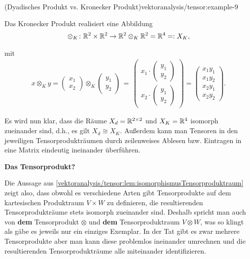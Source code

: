 \begin{example}{(Dyadisches Produkt vs. Kronecker Produkt)}{vektoranalysis/tensor:example-9}
\par
Das Kronecker Produkt realisiert eine Abbildung
\begin{align*}
\otimes_K \colon \mathbb{R}^2 \times \mathbb{R}^2 \rightarrow \mathbb{R}^2 \otimes_K \mathbb{R}^2 = \mathbb{R}^{4} =: X_K,
\end{align*}
\par
mit
\begin{align*}
x \otimes_K y =
\begin{pmatrix}
x_1 \\ x_2
\end{pmatrix} \otimes_K 
\begin{pmatrix}
y_1 \\ y_2
\end{pmatrix}
\, = \, 
\begin{pmatrix}
x_1 \cdot \begin{pmatrix} y_1 \\ y_2 \end{pmatrix} \\ 
x_2 \cdot \begin{pmatrix} y_1 \\ y_2 \end{pmatrix}
\end{pmatrix}
= 
\begin{pmatrix}
x_1y_1\\
x_1y_2\\
x_2y_1\\
x_2y_2
\end{pmatrix}.
\end{align*}
\par
Es wird nun klar, dass die Räume \(X_d = \mathbb{R}^{2 \times 2}\) und \(X_K = \mathbb{R}^4\) isomorph zueinander sind, d.h., es gilt \(X_d \cong X_K\).
Außerdem kann man Tensoren in den jeweiligen Tensorprodukträumen durch zeilenweises Ablesen bzw. Eintragen in eine Matrix eindeutig ineinander überführen.
\end{example}

\par
\textbf{Das Tensorprodukt?}

\par
Die Aussage aus \cref{vektoranalysis/tensor:lem:isomorphismusTensorproduktraum} zeigt also, dass obwohl es verschiedene Arten gibt Tensorprodukte auf dem kartesischen Produktraum \(V \times W\) zu definieren, die resultierenden Tensorprodukträume stets isomorph zueinander sind.
Deshalb spricht man auch von \textbf{dem} Tensorprodukt \(\otimes\) und \textbf{dem} Tensorproduktraum \(V \otimes W\), was so klingt als gäbe es jeweils nur ein einziges Exemplar.
In der Tat gibt es zwar mehrere Tensorprodukte aber man kann diese problemlos ineinander umrechnen und die resultierenden Tensorprodukträume alle miteinander identifizieren.

